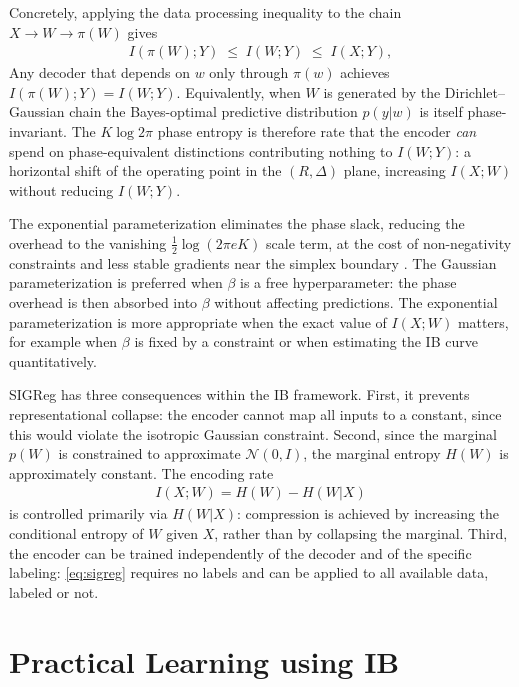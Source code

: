 \documentclass[11pt]{article}
\begin{document}
Concretely, applying the data processing inequality to the chain
$X\to W\to\pi(W)$ gives
\begin{align}
    I(\pi(W);Y) \;\leq\; I(W;Y) \;\leq\; I(X;Y),
    \label{eq:phase_dpi}
\end{align}
Any decoder that depends on $w$ only through $\pi(w)$ achieves
$I(\pi(W);Y)=I(W;Y)$.
Equivalently, when $W$ is generated by the Dirichlet--Gaussian chain
the Bayes-optimal predictive distribution $p(y|w)$ is itself
phase-invariant.
The $K\log 2\pi$ phase entropy is therefore rate that the encoder
\emph{can} spend on phase-equivalent distinctions contributing nothing
to $I(W;Y)$: a horizontal shift of the operating point in the
$(R,\Delta)$ plane, increasing $I(X;W)$ without reducing $I(W;Y)$.

The exponential parameterization eliminates the phase slack, reducing
the overhead to the vanishing $\tfrac{1}{2}\log(2\pi eK)$ scale term,
at the cost of non-negativity constraints and less stable gradients
near the simplex boundary \cite{joo2020dirichlet}.
The Gaussian parameterization is preferred when $\beta$ is a free
hyperparameter: the phase overhead is then absorbed into $\beta$
without affecting predictions.
The exponential parameterization is more appropriate when the exact
value of $I(X;W)$ matters, for example when $\beta$ is fixed
by a constraint or when estimating the IB curve quantitatively.

SIGReg has three consequences within the IB framework.
First, it prevents representational collapse: the encoder cannot map
all inputs to a constant, since this would violate the isotropic
Gaussian constraint.
Second, since the marginal $p(W)$ is constrained to approximate
$\mathcal{N}(0,I)$, the marginal entropy $H(W)$ is approximately
constant. The encoding rate
\begin{align}
    I(X;W) = H(W) - H(W|X)
    \label{eq:rate_decomp}
\end{align}
is controlled primarily via $H(W|X)$: compression is achieved by
increasing the conditional entropy of $W$ given $X$, rather than by
collapsing the marginal.
Third, the encoder can be trained independently of the decoder and of
the specific labeling: \eqref{eq:sigreg} requires no labels and can be
applied to all available data, labeled or not.


\section{Practical Learning using IB}
\end{document}
